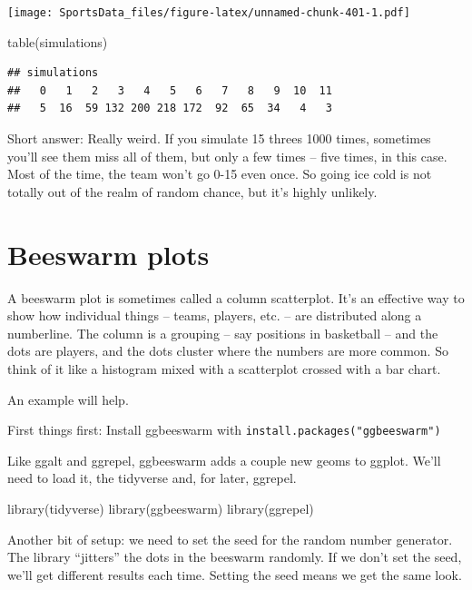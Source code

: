 \documentclass[
]{book}
\newenvironment{Shaded}{\begin{snugshade}}{\end{snugshade}}
\newcommand{\FunctionTok}[1]{\textcolor[rgb]{0.00,0.00,0.00}{#1}}
\newcommand{\NormalTok}[1]{#1}
\begin{document}
\texttt{[image: SportsData\_files/figure-latex/unnamed-chunk-401-1.pdf]}

\begin{Shaded}
\begin{Highlighting}[]
\FunctionTok{table}\NormalTok{(simulations)}
\end{Highlighting}
\end{Shaded}

\begin{verbatim}
## simulations
##   0   1   2   3   4   5   6   7   8   9  10  11 
##   5  16  59 132 200 218 172  92  65  34   4   3
\end{verbatim}

Short answer: Really weird. If you simulate 15 threes 1000 times, sometimes you'll see them miss all of them, but only a few times -- five times, in this case. Most of the time, the team won't go 0-15 even once. So going ice cold is not totally out of the realm of random chance, but it's highly unlikely.

\hypertarget{beeswarm-plots}{%
\chapter{Beeswarm plots}\label{beeswarm-plots}}

A beeswarm plot is sometimes called a column scatterplot. It's an effective way to show how individual things -- teams, players, etc. -- are distributed along a numberline. The column is a grouping -- say positions in basketball -- and the dots are players, and the dots cluster where the numbers are more common. So think of it like a histogram mixed with a scatterplot crossed with a bar chart.

An example will help.

First things first: Install ggbeeswarm with \texttt{install.packages("ggbeeswarm")}

Like ggalt and ggrepel, ggbeeswarm adds a couple new geoms to ggplot. We'll need to load it, the tidyverse and, for later, ggrepel.

\begin{Shaded}
\begin{Highlighting}[]
\FunctionTok{library}\NormalTok{(tidyverse)}
\FunctionTok{library}\NormalTok{(ggbeeswarm)}
\FunctionTok{library}\NormalTok{(ggrepel)}
\end{Highlighting}
\end{Shaded}

Another bit of setup: we need to set the seed for the random number generator. The library ``jitters'' the dots in the beeswarm randomly. If we don't set the seed, we'll get different results each time. Setting the seed means we get the same look.
\end{document}
